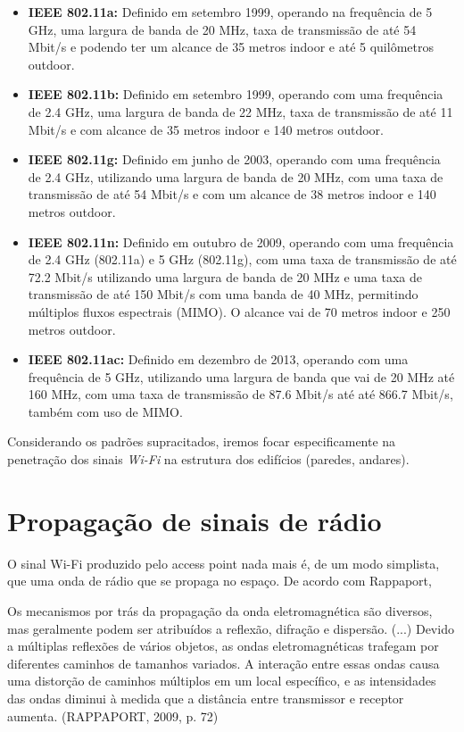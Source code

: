 \documentclass[
	12pt,				%
	openright,			%
	twoside,			%
	a4paper,			%
	english,			%
	french,				%
	spanish,			%
	brazil				%
	]{abntex2}
\begin{document}
\begin{itemize}
	\item \textbf{IEEE 802.11a:} Definido em setembro 1999, operando na frequência de 5 GHz, uma largura de banda de 20 MHz, taxa de transmissão de até 54 Mbit/s e podendo ter um alcance de 35 metros indoor e até 5 quilômetros outdoor.
	
	\item \textbf{IEEE 802.11b:} Definido em setembro 1999, operando com uma frequência de 2.4 GHz, uma largura de banda de 22 MHz, taxa de transmissão de até 11 Mbit/s e com alcance de 35 metros indoor e 140 metros outdoor.
	
	\item \textbf{IEEE 802.11g:} Definido em junho de 2003, operando com uma frequência de 2.4 GHz, utilizando uma largura de banda de 20 MHz, com uma taxa de transmissão de até 54 Mbit/s e com um alcance de 38 metros indoor e 140 metros outdoor.
	
	\item \textbf{IEEE 802.11n:} Definido em outubro de 2009, operando com uma frequência de 2.4 GHz (802.11a) e 5 GHz (802.11g), com uma taxa de transmissão de até 72.2 Mbit/s utilizando uma largura de banda de 20 MHz e uma taxa de transmissão de até 150 Mbit/s com uma banda de 40 MHz, permitindo múltiplos fluxos espectrais (MIMO). O alcance vai de 70 metros indoor e 250 metros outdoor.
	
	\item \textbf{IEEE 802.11ac:} Definido em dezembro de 2013, operando com uma frequência de 5 GHz, utilizando uma largura de banda que vai de 20 MHz até 160 MHz, com uma taxa de transmissão de 87.6 Mbit/s até até 866.7 Mbit/s, também com uso de MIMO. 
\end{itemize}

Considerando os padrões supracitados, iremos focar especificamente na penetração dos sinais \textit{Wi-Fi} na estrutura dos edifícios (paredes, andares).

\section[Propagação de sinais de rádio]{Propagação de sinais de rádio}

O sinal Wi-Fi produzido pelo access point nada mais é, de um modo simplista, que uma onda de rádio que se propaga no espaço. De acordo com Rappaport,

\begin{citacao}
	Os mecanismos por trás da propagação da onda eletromagnética são diversos, mas geralmente podem ser atribuídos a reflexão, difração e dispersão. (...) Devido a múltiplas reflexões de vários objetos, as ondas eletromagnéticas trafegam por diferentes caminhos de tamanhos variados. A interação entre essas ondas causa uma distorção de caminhos múltiplos em um local específico, e as intensidades das ondas diminui à medida que a distância entre transmissor e receptor aumenta. (RAPPAPORT, 2009, p. 72)
	
\end{citacao}
\end{document}
